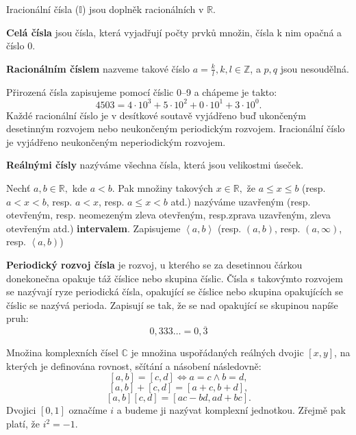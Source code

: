 Iracionální čísla ($\mathbb{I}$) jsou doplněk racionálních v $\mathbb{R}$.

\begin{definition}
  \textbf{Celá čísla} jsou čísla, která vyjadřují počty prvků množin, čísla k nim opačná a číslo 0.
\end{definition}

\begin{definition}
  \textbf{Racionálním číslem} nazveme takové číslo $a = \frac{k}{l}, k, l \in \mathbb{Z}$, a $p,q$ jsou nesoudělná.
\end{definition}

\begin{pozn}
  Přirozená čísla zapisujeme pomocí číslic 0--9 a chápeme je takto:
  $$4503=4\cdot 10^3+5\cdot 10^2 + 0 \cdot 10^1 + 3\cdot 10^0.$$
  Každé racionální číslo je v desítkové soutavě vyjádřeno buď ukončeným desetinným rozvojem nebo neukončeným periodickým rozvojem. Iracionální číslo je vyjádřeno neukončeným neperiodickým rozvojem.
\end{pozn}

\begin{definition}
  \textbf{Reálnými čísly} nazýváme všechna čísla, která jsou velikostmi úseček.
\end{definition}

\begin{definition}
  Nechť $a,b \in \mathbb{R},$ kde $a<b$. Pak množiny takových $x\in \mathbb{R},$ že $a\leq x\leq b$ (resp. $a < x < b$, resp. $a < x$, resp. $a \leq x < b$ atd.) nazýváme uzavřeným (resp. otevřeným, resp. neomezeným zleva otevřeným, resp.zprava uzavřeným, zleva otevřeným atd.) \textbf{intervalem}. Zapisujeme $\left<a,b\right>$ (resp. $\left(a,b\right)$, resp. $(a, \infty)$, resp. $\left<a, b\right)$)
\end{definition}

\begin{definition}
  \textbf{Periodický rozvoj čísla} je rozvoj, u kterého se za desetinnou čárkou donekonečna opakuje táž číslice nebo skupina číslic. Čísla s takovýmto rozvojem se nazývají ryze periodická čísla, opakující se číslice nebo skupina opakujících se číslic se nazývá perioda. Zapisují se tak, že se nad opakující se skupinou napíše pruh:
  $$0,333 … = 0,\overline{3}$$
\end{definition}

\begin{definition}
  Množina komplexních čísel $\mathbb C$ je množina uspořádaných reálných dvojic $[x, y]$, na kterých je definována rovnost, sčítání a násobení následovně:
$$[a, b] = [c, d] \Leftrightarrow a = c \land b = d,$$
$$[a, b] + [c, d] = [a + c, b + d],$$
$$[a, b][c, d] = [ac - bd, ad + bc].$$
  Dvojici $[0, 1]$ označíme $i$ a budeme ji nazývat komplexní jednotkou. Zřejmě pak platí, že $i^2 = -1$.
\end{definition}

